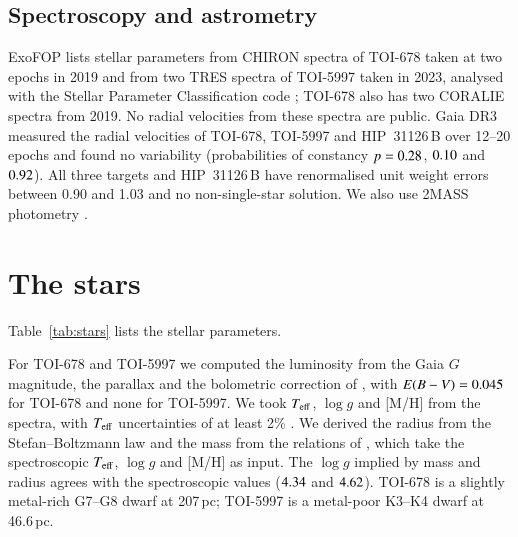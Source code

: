 \documentclass[twocolumn,numberedappendix,appendixfloats]{openjournal}
\begin{document}
\subsection{Spectroscopy and astrometry}
\label{sec:spec}

ExoFOP lists stellar parameters from CHIRON \citep{tokovinin2013} spectra of
TOI-678 taken at two epochs in 2019 and from two TRES spectra of TOI-5997 taken
in 2023, analysed with the Stellar Parameter Classification code
\citep[SPC;][]{buchhave2012}; TOI-678 also has two CORALIE \citep{queloz2000}
spectra from 2019. No radial velocities from these spectra are public. Gaia DR3
\citep{gaia2016,gaia2023} measured the radial velocities of TOI-678, TOI-5997
and HIP~31126\,B over 12--20 epochs \citep{katz2023} and found no variability
(probabilities of constancy $p = 0.28$, $0.10$ and $0.92$). All three
targets and HIP~31126\,B have renormalised unit weight errors
\citep[RUWE;][]{lindegren2021} between 0.90 and 1.03 and no non-single-star
solution. We also
use 2MASS photometry \citep{skrutskie2006}.

\section{The stars}
\label{sec:stars}

Table~\ref{tab:stars} lists the stellar parameters.

For TOI-678 and TOI-5997 we computed the luminosity from the Gaia $G$
magnitude, the parallax and the bolometric correction of \citet{andrae2018},
with $E(B-V) = 0.045$ for TOI-678 and none for TOI-5997. We took $T_{\rm
eff}$, $\log g$ and [M/H] from the spectra, with $T_{\rm eff}$ uncertainties
of at least 2\% \citep{tayar2022}. We derived the radius from the
Stefan--Boltzmann law and the mass from the relations of \citet{torres2010},
which take the spectroscopic $T_{\rm eff}$, $\log g$ and [M/H] as input. The
$\log g$ implied by mass and radius agrees with the spectroscopic values ($4.34$ and $4.62$).
TOI-678 is a slightly metal-rich G7--G8 dwarf at 207\,pc; TOI-5997 is a
metal-poor K3--K4 dwarf at 46.6\,pc.
\end{document}
